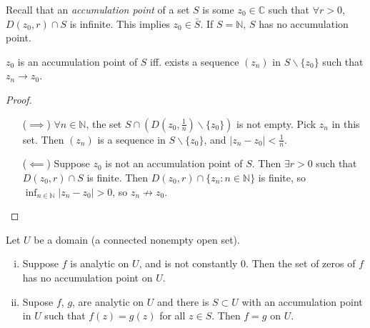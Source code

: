 Recall that an \emph{accumulation point} of a set $S$ is some
$z_0 \in \mathbb{C}$ such that $\forall r > 0$,
$D(z_0, r) \cap S$ is infinite. This implies $z_0 \in \bar{S}$.
If $S = \mathbb{N}$, $S$ has no accumulation point.

\begin{lemma}
  $z_0$ is an accumulation point of $S$ iff. exists a
  sequence $(z_n)$ in $S \backslash \{ z_0 \}$ such that $z_n \to z_0$.
\end{lemma}

\begin{proof}
  \begin{itemize}
    \item[($\implies$)]{
      $\forall n \in \mathbb{N}$, the set
      $S \cap (D(z_0, \frac{1}{n}) \backslash \{ z_0 \})$ is not empty.
      Pick $z_n$ in this set. Then $(z_n)$ is a sequence in
      $S \backslash \{z_0\}$, and $|z_n - z_0| < \frac{1}{n}$.
    }
    \item[($\impliedby$)]{
      Suppose $z_0$ is not an accumulation point of $S$. Then
      $\exists r > 0$ such that $D(z_0, r) \cap S$ is finite.
      Then $D(z_0, r) \cap \{ z_n : n \in \mathbb{N} \}$ is
      finite, so $\inf_{n \in \mathbb{N}} |z_n - z_0| > 0$,
      so $z_n {\not \to} z_0$.
    }
  \end{itemize}
\end{proof}

\begin{theorem}
  Let $U$ be a domain (a connected nonempty open set).
  \begin{enumerate}[(i)]
    \item{
      Suppose $f$ is analytic on $U$, and is not constantly 0.
      Then the set of zeros of $f$ has no accumulation point on $U$.
    }
    \item{
      Supose $f$, $g$, are analytic on $U$ and there is $S \subset U$
      with an accumulation point in $U$ such that $f(z) = g(z)$
      for all $z \in S$. Then $f = g$ on $U$.
    }
  \end{enumerate}
\end{theorem}

